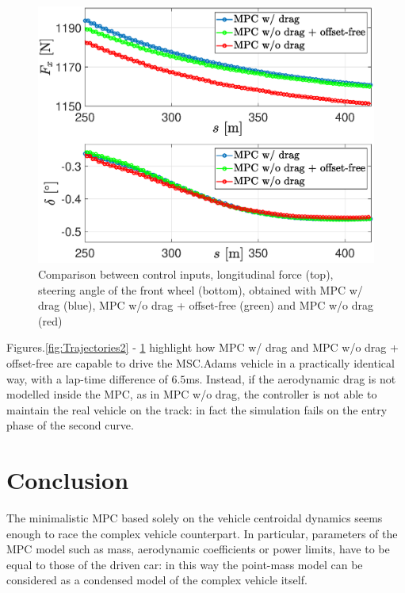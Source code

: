 \documentclass[conference]{IEEEtran} %
\begin{document}
\begin{figure}[htb] \centering
	\includegraphics[width=1.\linewidth]{steer_fx} %
	\caption{Comparison between control inputs, longitudinal force (top), steering angle of the front wheel (bottom), obtained with MPC w/ drag (blue), MPC w/o drag + offset-free (green) and MPC w/o drag (red)}
	\label{fig:steer_fx}
\end{figure}

Figures.\ref{fig:Trajectories2} - \ref{fig:steer_fx} highlight how MPC w/ drag and MPC w/o drag + offset-free are capable to drive the MSC.Adams vehicle in a practically identical way, with a lap-time difference of $6.5$ms. Instead, if the aerodynamic drag is not modelled inside the MPC, as in MPC w/o drag, the controller is not able to maintain the real vehicle on the track: in fact the simulation fails on the entry phase of the second curve.



\section{Conclusion}
The minimalistic MPC based solely on the vehicle centroidal dynamics seems enough to race the complex vehicle counterpart.
In particular, parameters of the MPC model such as mass, aerodynamic coefficients or power limits, have to be equal to those of the driven car: in this way the point-mass model can be considered as a condensed model of the complex vehicle itself.
\end{document}

